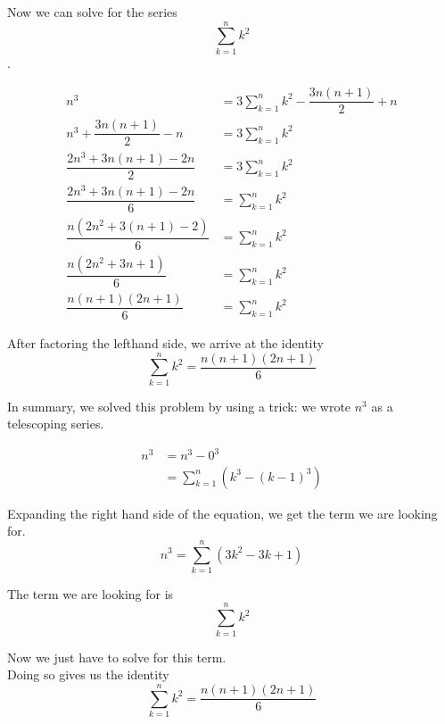 \documentclass{article}
\begin{document}
Now we can solve for the series $$\sum_{k=1}^{n} k^2$$.

\begin{align*}
n^3 &= 3 \sum_{k=1}^{n} k^2 - \dfrac{3n(n+1)}{2} + n \\
n^3 + \dfrac{3n(n+1)}{2} - n &= 3 \sum_{k=1}^{n} k^2 \\
\dfrac{2n^3 + 3n(n+1) - 2n}{2} &= 3 \sum_{k=1}^{n} k^2 \\
\dfrac{2n^3 + 3n(n+1) - 2n}{6} &= \sum_{k=1}^{n} k^2 \\
\dfrac{n(2n^2 + 3(n+1) - 2)}{6} &= \sum_{k=1}^{n} k^2 \\
\dfrac{n(2n^2 + 3n + 1)}{6} &= \sum_{k=1}^{n} k^2 \\
\dfrac{n(n+1)(2n+1)}{6} &= \sum_{k=1}^{n} k^2
\end{align*}

After factoring the lefthand side, we arrive at the identity $$\sum_{k=1}^{n} k^2 = \dfrac{n(n+1)(2n+1)}{6} $$

In summary, we solved this problem by using a trick: we wrote $n^3$ as a telescoping series.

\begin{align*}
n^3 &= n^3 - 0^3 \\
&= \sum_{k=1}^{n} \left( k^3 - (k-1)^3 \right)
\end{align*}

Expanding the right hand side of the equation, we get the term we are looking for. $$ n^3 = \sum_{k=1}^{n} \left( 3k^2 - 3k + 1 \right)  $$

The term we are looking for is $$ \sum_{k=1}^{n} k^2 $$

Now we just have to solve for this term. \\

Doing so gives us the identity $$\sum_{k=1}^{n} k^2 = \dfrac{n(n+1)(2n+1)}{6} $$
\end{document}
